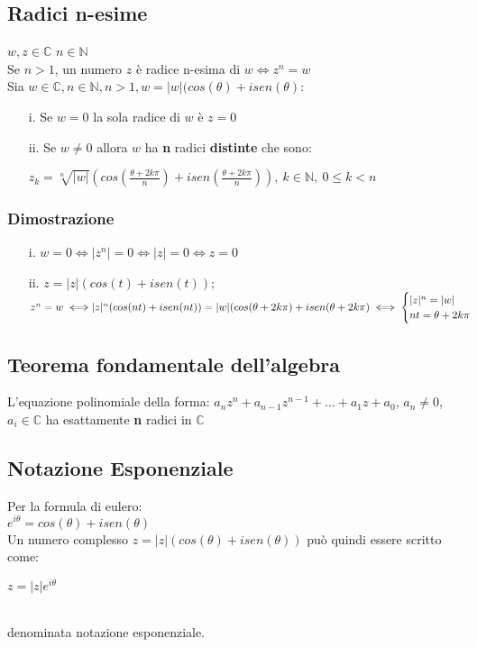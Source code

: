 \subsection{Radici n-esime}
$w,z \in \mathbb{C}$\; $n \in \mathbb{N}$\\
Se $n>1$, un numero $z$ è radice n-esima di $w \iff z^n=w$\\
Sia $w \in \mathbb{C}, n \in \mathbb{N}, n>1, w=|w|(cos(\theta)+isen(\theta)$:\\
\begin{enumerate}
\item[i.] Se $w=0$ la sola radice di $w$ è $z=0$
\item[ii.] Se $w\neq0$ allora $w$ ha \textbf{n} radici \textbf{distinte} che sono:\\
\begin{Large}
$z_k=\sqrt[n]{|w|}(cos(\frac{\theta+2k\pi}{n})+isen(\frac{\theta+2k\pi}{n})),\ k \in \mathbb{N},\ 0\leq k<n$
\end{Large}
\end{enumerate}
\subsubsection{Dimostrazione}
\begin{enumerate}
\item[i.]$w=0 \iff |z^n|=0 \iff |z|=0 \iff z=0$
\item[ii.]$z=|z|(cos(t)+isen(t))$; $z^n=w \iff \\
|z|^n(cos(nt)+isen(nt)) = |w|(cos(\theta+2k\pi)+isen(\theta +2k\pi) \iff
\begin{cases}
|z|^n = |w|\\
nt = \theta +2k\pi
\end{cases}$
\end{enumerate}
\subsection{Teorema fondamentale dell'algebra}
L'equazione polinomiale della forma: $a_nz^n + a_{n-1}z^{n-1}+...+a_1z+a_0$, $a_n \neq 0$, $a_i \in \mathbb{C}$ ha esattamente \textbf{n} radici in $\mathbb{C}$

\subsection{Notazione Esponenziale}
Per la formula di eulero:\\
$e^{i\theta} = cos(\theta)+isen(\theta)$\\
Un numero complesso $z = |z|(cos(\theta)+isen(\theta))$ può quindi essere scritto come:\\
\begin{Large}
$z = |z|e^{i\theta}$
\end{Large}\\
denominata notazione esponenziale.